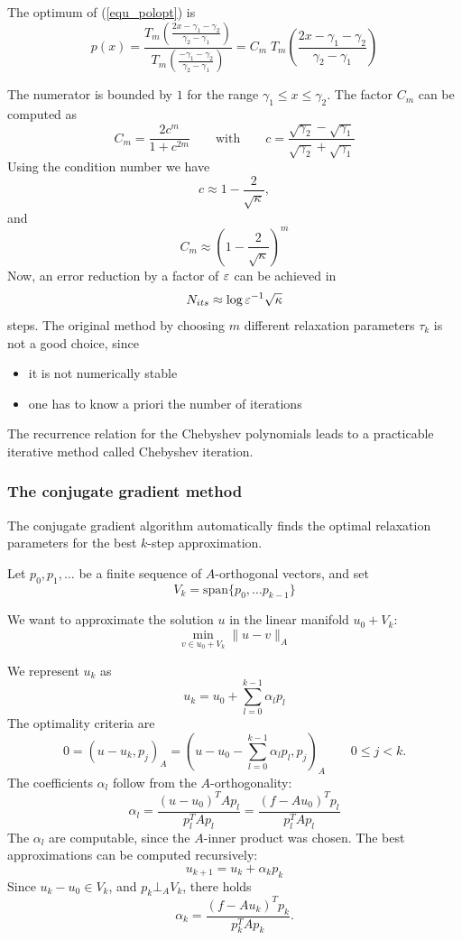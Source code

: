 The optimum of (\ref{equ_polopt}) is 
$$
p(x) = \frac{T_m \left( \frac{2x-\gamma_1-\gamma_2}{\gamma_2-\gamma_1} \right)}
        {T_m \left( \frac{-\gamma_1-\gamma_2}{\gamma_2-\gamma_1} \right)}
        = C_m \; T_m \left( \frac{2x-\gamma_1-\gamma_2}{\gamma_2-\gamma_1} \right)
$$

The numerator is bounded by $1$ for the range $\gamma_1 \leq x \leq \gamma_2$.
The factor $C_m$ can be computed as
$$
C_m
        = \frac{2 c^m}{1+c^{2m}}
\qquad \mbox{with} \qquad
        c = \frac{\sqrt{\gamma_2} - \sqrt{\gamma_1}}{\sqrt{\gamma_2} + \sqrt{\gamma_1}}
$$
Using the condition number we have
$$
c \approx 1 - \frac{2}{\sqrt \kappa},
$$
and
$$
C_m \approx
( 1 - \frac{2}{\sqrt \kappa})^m
$$
Now, an error reduction by a factor of $\varepsilon$ can be achieved in
$$
N_{its} \approx \log \varepsilon^{-1} \sqrt{\kappa}
$$
steps. The original method by choosing $m$ different relaxation parameters 
$\tau_k$ is not a good choice, since
\begin{itemize}
\item it is not numerically stable
\item one has to know a priori the number of iterations 
\end{itemize}
The recurrence relation for the Chebyshev polynomials leads to a practicable
iterative method called Chebyshev iteration. 

\subsubsection{The conjugate gradient method}

The conjugate gradient algorithm automatically finds the optimal 
relaxation parameters for the best $k$-step approximation.



Let $p_0, p_1, \ldots$ be a finite sequence of $A$-orthogonal vectors, and set 
$$
V_k = \mbox{span} \{ p_0, \ldots p_{k-1} \}
$$

We want to approximate the solution $u$ in the linear manifold $u_0+ V_k$:
$$
\min_{v \in u_0 + V_k} \| u - v \|_A 
$$

We represent $u_k$ as
$$
u_k = u_0 + \sum_{l=0}^{k-1} \alpha_l p_l
$$
The optimality criteria are
$$
0 = (u-u_k, p_j)_A = (u - u_0 - \sum_{l=0}^{k-1} \alpha_l p_l, p_j)_A 
 \qquad   0 \leq j < k.
$$
The coefficients $\alpha_l$ follow from the $A$-orthogonality:
$$
\alpha_l = \frac{(u-u_0)^T A p_l}{p_l^T A p_l} = \frac{(f-A u_0)^T p_l}{p_l^T A p_l} 
$$
The $\alpha_l$ are computable, since the $A$-inner product was chosen.
The best approximations can be computed recursively:
$$
u_{k+1} = u_k + \alpha_k p_k
$$
Since $u_k - u_0 \in V_k$, and $p_k \bot_A V_k$, there holds
$$
\alpha_k = \frac{(f-A u_k)^T p_k}{p_k^T A p_k}.
$$


